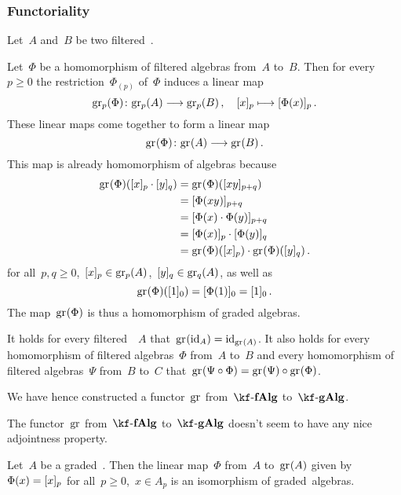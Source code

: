 \subsubsection{Functoriality}

\begin{construction}
	Let~$A$ and~$B$ be two filtered~\algebra{$\kf$}.
	
	Let~$\Phi$ be a homomorphism of filtered algebras from~$A$ to~$B$.
	Then for every~$p \geq 0$ the restriction~$\Phi_{(p)}$ of~$\Phi$ induces a linear map
	\[
		\gr[p](\Phi)
		\colon
		\gr[p](A)
		\to
		\gr[p](B) \,,
		\quad
		\fclass{x}_p
		\mapsto
		\fclass{ \Phi(x) }_p  \,.
	\]
	These linear maps come together to form a linear map
	\[
		\gr(\Phi)
		\colon
		\gr(A)
		\to
		\gr(B)  \,.
	\]
	This map is already homomorphism of algebras because
	\begin{align*}
		\gr(\Phi)( \fclass{x}_p \cdot \fclass{y}_q )
		&=
		\gr(\Phi)( \fclass{xy}_{p+q} )
		\\
		&=
		\fclass{ \Phi(xy) }_{p+q}
		\\
		&=
		\fclass{ \Phi(x) \cdot \Phi(y) }_{p+q}
		\\
		&=
		\fclass{ \Phi(x) }_p \cdot \fclass{ \Phi(y) }_q
		\\
		&=
		\gr(\Phi)(\fclass{x}_p) \cdot \gr(\Phi)(\fclass{y}_q) \,.
	\end{align*}
	for all~$p, q \geq 0$,~$\fclass{x}_p \in \gr[p](A)$,~$\fclass{y}_q \in \gr[q](A)$, as well as
	\[
		\gr(\Phi)( \fclass{1}_0 )
		=
		\fclass{ \Phi(1) }_0
		=
		\fclass{ 1 }_0 \,.
	\]
	The map~$\gr(\Phi)$ is thus a homomorphism of graded algebras.

	It holds for every filtered~\algebra{$\kf$}~$A$ that~$\gr(\id_A) = \id_{\gr(A)}$.
	It also holds for every homomorphism of filtered algebras~$\Phi$ from~$A$ to~$B$ and every homomorphism of filtered algebras~$\Psi$ from~$B$ to~$C$ that~$\gr(\Psi \circ \Phi) = \gr(\Psi) \circ \gr(\Phi)$.
	
	We have hence constructed a functor~$\gr$ from~$\cfAlg{\kf}$ to~$\cgAlg{\kf}$.
\end{construction}


\begin{remark}
	The functor~$\gr$ from~$\cfAlg{\kf}$ to~$\cgAlg{\kf}$ doesn’t seem to have any nice adjointness property.
\end{remark}


\begin{proposition}
	Let~$A$ be a graded~{\algebra{$\kf$}}.
	Then the linear map~$\Phi$ from~$A$ to~$\gr(A)$ given by~$\Phi(x) = \lbrack x\rbrack_p$ for all~$p \geq 0$,~$x \in A_p$ is an isomorphism of graded~algebras.
\end{proposition}



